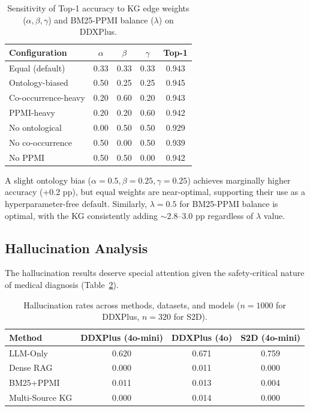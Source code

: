 \documentclass[preprint,12pt]{elsarticle}
\begin{document}
\begin{table}[t]
\centering
\caption{Sensitivity of Top-1 accuracy to KG edge weights ($\alpha, \beta, \gamma$) and BM25-PPMI balance ($\lambda$) on DDXPlus.}
\label{tab:weight_sensitivity}
\begin{tabular}{lcccc}
\toprule
\textbf{Configuration} & $\alpha$ & $\beta$ & $\gamma$ & \textbf{Top-1} \\
\midrule
Equal (default) & 0.33 & 0.33 & 0.33 & 0.943 \\
Ontology-biased & 0.50 & 0.25 & 0.25 & 0.945 \\
Co-occurrence-heavy & 0.20 & 0.60 & 0.20 & 0.943 \\
PPMI-heavy & 0.20 & 0.20 & 0.60 & 0.942 \\
No ontological & 0.00 & 0.50 & 0.50 & 0.929 \\
No co-occurrence & 0.50 & 0.00 & 0.50 & 0.939 \\
No PPMI & 0.50 & 0.50 & 0.00 & 0.942 \\
\bottomrule
\end{tabular}
\end{table}

A slight ontology bias ($\alpha{=}0.5, \beta{=}0.25, \gamma{=}0.25$) achieves marginally higher accuracy (+0.2 pp), but equal weights are near-optimal, supporting their use as a hyperparameter-free default. Similarly, $\lambda{=}0.5$ for BM25-PPMI balance is optimal, with the KG consistently adding ${\sim}2.8$--$3.0$ pp regardless of $\lambda$ value.

\subsection{Hallucination Analysis}
\label{sec:hallucination}

The hallucination results deserve special attention given the safety-critical nature of medical diagnosis (Table~\ref{tab:halluc}).

\begin{table}[t]
\centering
\caption{Hallucination rates across methods, datasets, and models ($n{=}1000$ for DDXPlus, $n{=}320$ for S2D).}
\label{tab:halluc}
\begin{tabular}{lccc}
\toprule
\textbf{Method} & \textbf{DDXPlus (4o-mini)} & \textbf{DDXPlus (4o)} & \textbf{S2D (4o-mini)} \\
\midrule
LLM-Only        & 0.620 & 0.671 & 0.759 \\
Dense RAG        & 0.000 & 0.011 & 0.000 \\
BM25+PPMI        & 0.011 & 0.013 & 0.004 \\
Multi-Source KG  & 0.000 & 0.014 & 0.000 \\
\bottomrule
\end{tabular}
\end{table}
\end{document}
